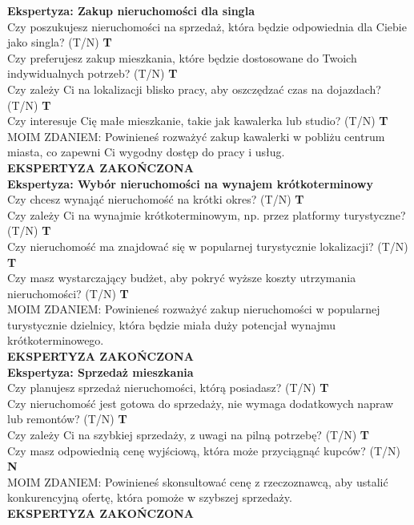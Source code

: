 \noindent \textbf{Ekspertyza: Zakup nieruchomości dla singla}\\
\noindent Czy poszukujesz nieruchomości na sprzedaż, która będzie odpowiednia dla Ciebie jako singla? (T/N) \textbf{T} \\
\noindent Czy preferujesz zakup mieszkania, które będzie dostosowane do Twoich indywidualnych potrzeb? (T/N) \textbf{T} \\
\noindent Czy zależy Ci na lokalizacji blisko pracy, aby oszczędzać czas na dojazdach? (T/N) \textbf{T} \\
\noindent Czy interesuje Cię małe mieszkanie, takie jak kawalerka lub studio? (T/N) \textbf{T} \\
MOIM ZDANIEM: Powinieneś rozważyć zakup kawalerki w pobliżu centrum miasta, co zapewni Ci wygodny dostęp do pracy i usług.\\
\textbf{EKSPERTYZA ZAKOŃCZONA}\\

\noindent \textbf{Ekspertyza: Wybór nieruchomości na wynajem krótkoterminowy}\\
\noindent Czy chcesz wynająć nieruchomość na krótki okres? (T/N) \textbf{T} \\
\noindent Czy zależy Ci na wynajmie krótkoterminowym, np. przez platformy turystyczne? (T/N) \textbf{T} \\
\noindent Czy nieruchomość ma znajdować się w popularnej turystycznie lokalizacji? (T/N) \textbf{T} \\
\noindent Czy masz wystarczający budżet, aby pokryć wyższe koszty utrzymania nieruchomości? (T/N) \textbf{T} \\
MOIM ZDANIEM: Powinieneś rozważyć zakup nieruchomości w popularnej turystycznie dzielnicy, która będzie miała duży potencjał wynajmu krótkoterminowego.\\
\textbf{EKSPERTYZA ZAKOŃCZONA}\\

\noindent \textbf{Ekspertyza: Sprzedaż mieszkania}\\
\noindent Czy planujesz sprzedaż nieruchomości, którą posiadasz? (T/N) \textbf{T} \\
\noindent Czy nieruchomość jest gotowa do sprzedaży, nie wymaga dodatkowych napraw lub remontów? (T/N) \textbf{T} \\
\noindent Czy zależy Ci na szybkiej sprzedaży, z uwagi na pilną potrzebę? (T/N) \textbf{T} \\
\noindent Czy masz odpowiednią cenę wyjściową, która może przyciągnąć kupców? (T/N) \textbf{N} \\
MOIM ZDANIEM: Powinieneś skonsultować cenę z rzeczoznawcą, aby ustalić konkurencyjną ofertę, która pomoże w szybszej sprzedaży.\\
\textbf{EKSPERTYZA ZAKOŃCZONA}\\


